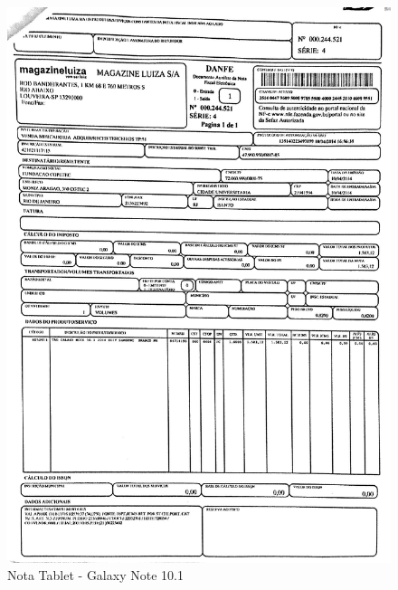 \begin{figure}[h!]
 \centering
 \includegraphics[width=1\columnwidth]{Tablet/nota_tablet.pdf}
 \caption{Nota Tablet - Galaxy Note 10.1}
 \end{figure}